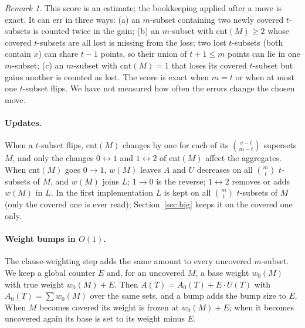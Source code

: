 \documentclass[11pt]{article}
\theoremstyle{remark}
\newtheorem{remark}[lemma]{Remark}
\newcommand{\cnt}{\mathrm{cnt}}
\begin{document}
\begin{remark}\label{rem:approx}
This score is an estimate; the bookkeeping applied after a move is exact. It can err in three ways: (a) an
$m$-subset containing two newly covered $t$-subsets is counted twice in the gain; (b) an $m$-subset with
$\cnt(M)\ge 2$ whose covered $t$-subsets are all lost is missing from the loss; two lost $t$-subsets (both contain $x$)
can share $t-1$ points, so their union of $t+1\le m$ points can lie in one $m$-subset; (c) an $m$-subset with
$\cnt(M)=1$ that loses its covered $t$-subset but gains another is counted as lost. The score is exact when $m=t$ or
when at most one $t$-subset flips. We have not measured how often the errors change the chosen move.
\end{remark}

\paragraph{Updates.} When a $t$-subset flips, $\cnt(M)$ changes by one for each of its $\binom{v-t}{m-t}$ supersets
$M$, and only the changes $0\leftrightarrow 1$ and $1\leftrightarrow 2$ of $\cnt(M)$ affect the aggregates. When
$\cnt(M)$ goes $0\to 1$, $w(M)$ leaves $A$ and $U$ decreases on all $\binom{m}{t}$ $t$-subsets of $M$, and $w(M)$
joins $L$; $1\to 0$ is the reverse; $1\leftrightarrow 2$ removes or adds $w(M)$ in $L$. In the first implementation
$L$ is kept on all $\binom{m}{t}$ $t$-subsets of $M$ (only the covered one is ever read); Section~\ref{sec:big} keeps
it on the covered one only.

\paragraph{Weight bumps in $O(1)$.} The clause-weighting step adds the same amount to every uncovered $m$-subset. We
keep a global counter $E$ and, for an uncovered $M$, a base weight $w_0(M)$ with true weight $w_0(M)+E$. Then
$A(T)=A_0(T)+E\cdot U(T)$ with $A_0(T)=\sum w_0(M)$ over the same sets, and a bump adds the bump size to $E$. When $M$
becomes covered its weight is frozen at $w_0(M)+E$; when it becomes uncovered again its base is set to its weight minus
$E$.
\end{document}
